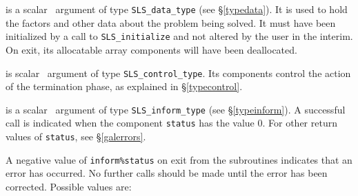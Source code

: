 \documentclass{galahad}
\newcommand{\packagename}{SLS}
\begin{document}
\begin{description}

 is a scalar \intentinout\ argument of type
{\tt \packagename\_data\_type}
(see \S\ref{typedata}). It is used to hold the factors and other
data about the problem being solved.
It must have been initialized by a call to
{\tt \packagename\_ini\-tialize} and not altered by the user in the interim.
On exit, its allocatable array components will have been deallocated.

 is scalar \intentin\ argument of type
{\tt \packagename\_control\_type}. Its components control the action
of the termination phase, as explained in
\S\ref{typecontrol}.

 is a scalar \intentinout\ argument of type
{\tt \packagename\_inform\_type}
(see \S\ref{typeinform}).
A successful call is indicated when the  component {\tt status} has the value 0.
For other return values of {\tt status}, see \S\ref{galerrors}.

\end{description}


\galerrors
A negative value of {\tt inform\%status} on exit from the subroutines
indicates that an error has occurred. No further calls should be made
until the error has been corrected. Possible values are:
\end{document}
